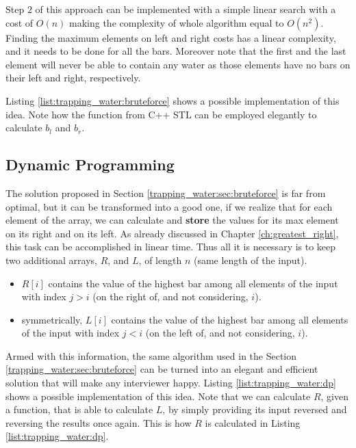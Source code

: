 Step $2$ of this approach can be implemented with a simple linear search with a cost of $O(n)$ making the complexity of whole algorithm equal to $O(n^2)$. Finding the maximum elements on left and right costs has a linear complexity, and it needs to be done for all the bars.
Moreover note that the first and the last element will never be able to contain any water as those elements have no bars on their left and right, respectively.

Listing \ref{list:trapping_water:bruteforce} shows a possible implementation of this idea. Note how the  function from C++ STL can be employed elegantly to calculate $b_l$ and $b_r$.





\subsection{Dynamic Programming}
\label{trapping_water:sec:dp}
The solution proposed in Section \ref{trapping_water:sec:bruteforce} is far from optimal, but it can be transformed into a good one, if we realize that
for each element of the array, we can calculate and \textbf{store} the values for its max element on its right and on its left. As already discussed in Chapter \ref{ch:greatest_right}, this task can be accomplished in linear time. Thus all it is necessary is to keep two additional arrays, $R$, and $L$, of  length $n$ (same length of the input). 

\begin{itemize}
	\item $R[i]$ contains the value of the highest bar among all elements of the input with index $j > i$ (on the right of, and not considering, $i$).
	\item symmetrically, $L[i]$ contains the value of the highest bar among all elements of the input with index $j < i$ (on the left of, and not considering, $i$).
\end{itemize}

Armed with this information, the same algorithm used in the Section \ref{trapping_water:sec:bruteforce} can be turned into an elegant and efficient solution that will make any interviewer happy. Listing \ref{list:trapping_water:dp} shows a possible implementation of this idea. Note that we can calculate $R$, given a function,  that is able to calculate $L$, by simply providing its input reversed and reversing the results once again. This is how $R$ is calculated in Listing \ref{list:trapping_water:dp}.

